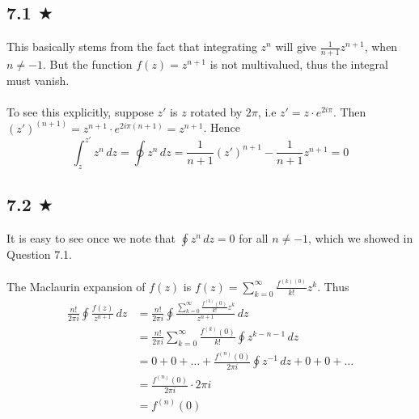 

\subsection{7.1 $\bigstar$}
This basically stems from the fact that integrating $z^{n}$ will give $\frac{1}{n+1}z^{n+1}$, when $n\neq -1$. But the function $f(z)=z^{n+1}$ is not multivalued, thus the integral must vanish.\\ \\ To see this explicitly, suppose $z'$ is $z$ rotated by $2\pi$, i.e $z'=z\cdot e^{2i\pi}$. Then $(z')^{(n+1)}=z^{n+1}\cdot e^{2i\pi(n+1)}=z^{n+1}$. Hence
$$\int_{z}^{z'}z^n\, dz=\oint z^n\, dz=\frac{1}{n+1}(z')^{n+1}-\frac{1}{n+1}z^{n+1}=0$$


\subsection*{7.2 $\bigstar$}
It is easy to see once we note that $\oint z^n\, dz=0$ for all $n\neq -1$, which we showed in Question 7.1. \\ \\
The Maclaurin expansion of $f(z)$ is $f(z)=\sum_{k=0}^{\infty}\frac{f^{(k)(0)}}{k!}z^k$. Thus
\begin{align*}
\frac{n!}{2\pi i}\oint \frac{f(z)}{z^{n+1}}\, dz&= \frac{n!}{2\pi i}\oint \frac{\sum_{k=0}^{\infty}\frac{f^{(k)}(0)}{k!}z^k}{z^{n+1}}\, dz\\
&= \frac{n!}{2\pi i}\sum_{k=0}^{\infty}\frac{f^{(k)}(0)}{k!}\oint z^{k-n-1}\, dz\\
&=0+0+\ldots +\frac{f^{(n)}(0)}{2\pi i}\oint z^{-1}\, dz+0+0+\ldots\\
&=\frac{f^{(n)}(0)}{2\pi i}\cdot 2\pi i\\
&=f^{(n)}(0)
\end{align*}


